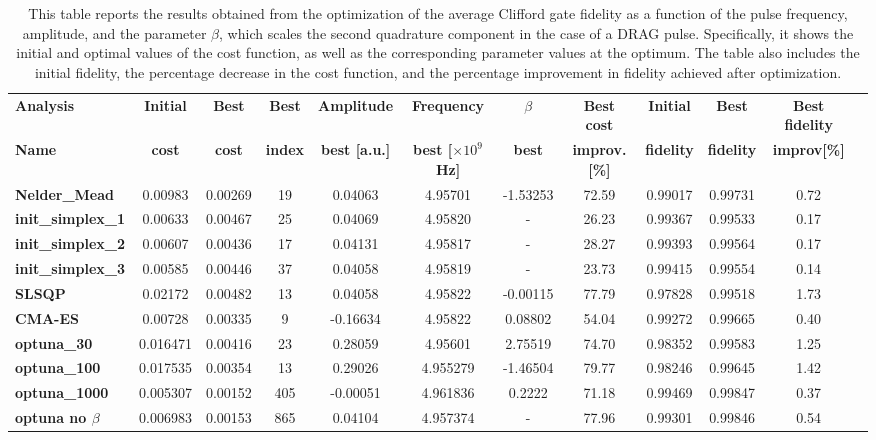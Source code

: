\begin{table}
    \centering
    \begin{tabular}{lccccccccccc}
        \toprule
        \textbf{Analysis} & \textbf{Initial} & \textbf{Best} & \textbf{Best} & \textbf{Amplitude} & \textbf{Frequency} & \textbf{$\beta$} & \textbf{Best cost} & \textbf{Initial} & \textbf{Best} & \textbf{Best fidelity} \\
        \textbf{Name} & \textbf{cost} & \textbf{cost} & \textbf{index} & \textbf{best [a.u.]} & \textbf{ best [$\times10^9$ Hz]} & \textbf{best} & \textbf{improv. [\%]} & \textbf{fidelity} & \textbf{fidelity} & \textbf{improv[\%]} \\
        \midrule
        \textbf{Nelder\_Mead} & 0.00983 & 0.00269 & 19 & 0.04063 & 4.95701 & -1.53253 & 72.59 & 0.99017 & 0.99731 & 0.72 \\
        \textbf{init\_simplex\_1} & 0.00633 & 0.00467 & 25 & 0.04069 & 4.95820 & - & 26.23 & 0.99367 & 0.99533 & 0.17 \\
        \textbf{init\_simplex\_2} & 0.00607 & 0.00436 & 17 & 0.04131 & 4.95817 & - & 28.27 & 0.99393 & 0.99564 & 0.17 \\
        \textbf{init\_simplex\_3} & 0.00585 & 0.00446 & 37 & 0.04058 & 4.95819 & - & 23.73 & 0.99415 & 0.99554 & 0.14 \\
        \textbf{SLSQP} & 0.02172 & 0.00482 & 13 & 0.04058 & 4.95822 & -0.00115 & 77.79 & 0.97828 & 0.99518 & 1.73 \\
        \textbf{CMA-ES} & 0.00728 & 0.00335 & 9 & -0.16634 & 4.95822 & 0.08802 & 54.04 & 0.99272 & 0.99665 & 0.40 \\
        \textbf{optuna\_30} & 0.016471 & 0.00416 & 23 & 0.28059 & 4.95601 & 2.75519 & 74.70 & 0.98352 & 0.99583 & 1.25 \\
        \textbf{optuna\_100} & 0.017535 & 0.00354& 13 & 0.29026 & 4.955279 & -1.46504 & 79.77 & 0.98246 & 0.99645 & 1.42\\
        \textbf{optuna\_1000} & 0.005307 & 0.00152 & 405 & -0.00051 & 4.961836 & 0.2222 & 71.18 & 0.99469 & 0.99847 & 0.37\\
        \textbf{optuna no $\beta$} & 0.006983 & 0.00153 & 865 & 0.04104 & 4.957374 & - & 77.96 & 0.99301 & 0.99846 & 0.54\\
        \bottomrule
    \end{tabular}
    \caption{This table reports the results obtained from the optimization of the average Clifford gate fidelity as a function of the pulse frequency, amplitude, and the parameter $\beta$, which scales the second quadrature component in the case of a DRAG pulse.
    Specifically, it shows the initial and optimal values of the cost function, as well as the corresponding parameter values at the optimum. 
    The table also includes the initial fidelity, the percentage decrease in the cost function, and the percentage improvement in fidelity achieved after optimization.}
    \label{tab:best_values}
\end{table}

